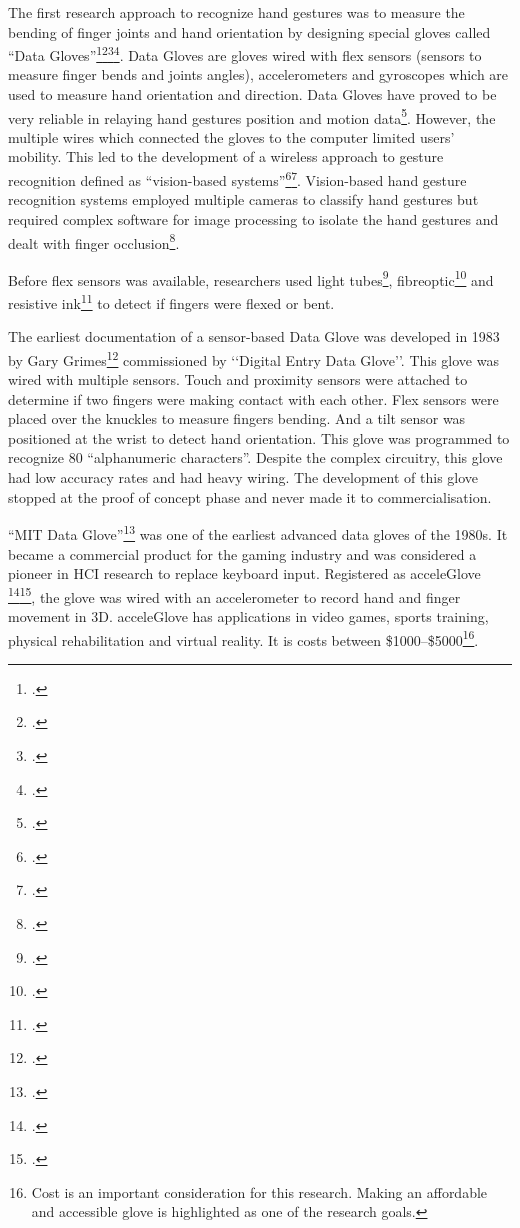 The first research approach to recognize hand gestures was to measure the bending of finger joints and hand orientation by designing special gloves called ``Data Gloves''\footcite{Rautaray2015}\footcite{Pavlovic1997}\footcite{Takahashi1992}\footcite{Liang1998}. Data Gloves are gloves wired with flex sensors (sensors to measure finger bends and joints angles), accelerometers and gyroscopes which are used to measure hand orientation and direction. Data Gloves have proved to be very reliable in relaying hand gestures position and motion data\footcite{Mitra2007}. However, the multiple wires which connected the gloves to the computer limited users' mobility. This led to the development of a wireless approach to gesture recognition defined as ``vision-based systems''\footcite{Rautaray2015}\footcite{Pavlovic1997}. Vision-based hand gesture recognition systems employed multiple cameras to classify hand gestures but required complex software for image processing to isolate the hand gestures and dealt with finger occlusion\footcite{Shen2012}. 

Before flex sensors was available, researchers used light tubes\footcite{DipietroL.SabatiniA.M.Dario2008}, fibreoptic\footcite{DipietroL.SabatiniA.M.Dario2008} and resistive ink\footcite{LaViola1999} to detect if fingers were flexed or bent. 

The earliest documentation of a sensor-based Data Glove was developed in 1983 by Gary Grimes\footcite{DipietroL.SabatiniA.M.Dario2008} commissioned by ‘‘Digital Entry Data Glove’'. This glove was wired with multiple sensors. Touch and proximity sensors were attached to determine if two fingers were making contact with each other. Flex sensors were placed over the knuckles to measure fingers bending. And a tilt sensor was positioned at the wrist to detect hand orientation. This glove was programmed to recognize 80 ``alphanumeric characters''. Despite the complex circuitry, this glove had low accuracy rates and had heavy wiring. The development of this glove stopped at the proof of concept phase and never made it to commercialisation.

``MIT Data Glove''\footcite{Premaratne2010} was one of the earliest advanced data gloves of the 1980s. It became a commercial product for the gaming industry and was considered a pioneer in HCI research to replace keyboard input. Registered as acceleGlove \footcite{AcceleGlove2016}\footcite{AcceleGlove2017}, the glove was wired with an accelerometer to record hand and finger movement in 3D. acceleGlove has applications in video games, sports training, physical rehabilitation and virtual reality. It is costs between \$1000–\$5000\footnote{Cost is an important consideration for this research. Making an affordable and accessible glove is highlighted as one of the research goals.}.

